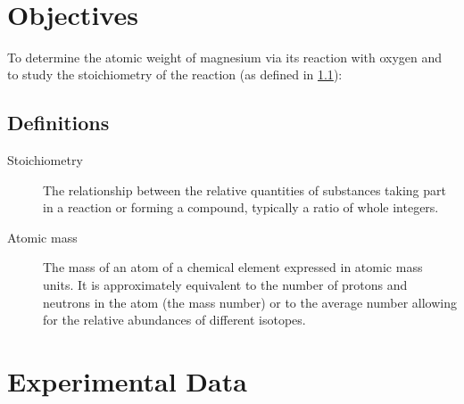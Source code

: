 \documentclass[
	letterpaper, %
	11pt, %
]{CSUniSchoolLabReport}
\begin{document}
\\\section{Objectives}

To determine the atomic weight of magnesium via its reaction with oxygen and to study the stoichiometry of the reaction (as defined in \ref{definitions}):

\begin{center}
\end{center}


\subsection{Definitions}\label{definitions} %

\begin{description}
	\item[Stoichiometry] The relationship between the relative quantities of substances taking part in a reaction or forming a compound, typically a ratio of whole integers.
	\item[Atomic mass] The mass of an atom of a chemical element expressed in atomic mass units. It is approximately equivalent to the number of protons and neutrons in the atom (the mass number) or to the average number allowing for the relative abundances of different isotopes. 
\end{description} 
 

\section{Experimental Data}
\end{document}

